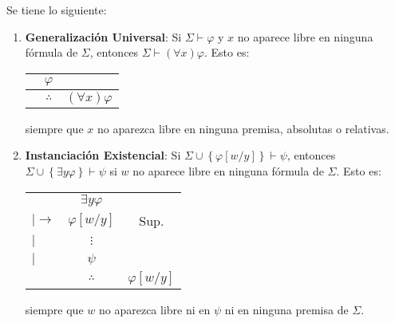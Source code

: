 \documentclass[12pt]{report}
\newcounter{it}
\theoremstyle{largebreak}
\begin{document}
    \begin{theor}
        Se tiene lo siguiente:
        \begin{enumerate}
            \item \textbf{Generalización Universal}: Si $\Sigma\vdash\varphi$ y $x$ no aparece libre en ninguna fórmula de $\Sigma$, entonces $\Sigma\vdash(\forall x)\varphi$. Esto es:
            \begin{center}
                \begin{tabular}{c c c}
                    & $\varphi$  &  \\
                    \hline
                     & $\therefore$ & $(\forall x)\varphi$ \\
                \end{tabular}
            \end{center}
            siempre que $x$ no aparezca libre en ninguna premisa, absolutas o relativas.
            \item \textbf{Instanciación Existencial}: Si $\Sigma\cup\left\{\varphi[w/y]\right\} \vdash\psi$, entonces $\Sigma\cup\left\{\exists y\varphi \right\}\vdash\psi$ si $w$ no aparece libre en ninguna fórmula de $\Sigma$. Esto es:
            \begin{center}
                \begin{tabular}{l c c}
                    & $\exists y\varphi$  &  \\
                   $|\longrightarrow$ & $\varphi[w/y]$  & Sup. \\
                    $|$ & $\vdots$  &  \\
                    $|$ & $\psi$  &  \\
                    \hline
                     & $\therefore$ & $\varphi[w/y]$ \\
                \end{tabular}
            \end{center}
            siempre que $w$ no aparezca libre ni en $\psi$ ni en ninguna premisa de $\Sigma$.
        \end{enumerate}
    \end{theor}
\end{document}
